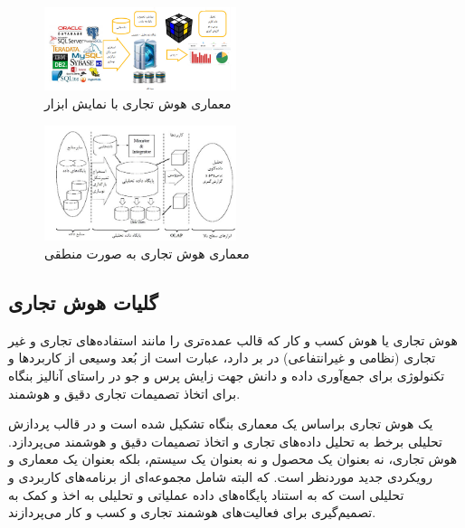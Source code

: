 \documentclass{llncs}
\begin{document}
\begin{figure}
\centering
\includegraphics[width=0.5\textwidth]{mahi/bi-2.jpg}
\centering
\caption{معماری هوش تجاری با نمایش ابزار}
\label{fig:ReportedVariables}
\end{figure}
\begin{figure}
\centering
\includegraphics[width=0.5\textwidth]{mahi/bi-3.jpg}
\centering
\caption{معماری هوش تجاری به صورت منطقی}
\label{fig:ReportedVariables}
\end{figure}

\subsection{گلیات هوش تجاری}
هوش تجاری یا هوش کسب و کار که قالب عمده‌تری را مانند استفاده‌های تجاری و غیر تجاری (نظامی و غیر‌انتفاعی) در بر دارد، عبارت است از بُعد وسیعی از کاربردها و تکنولوژی برای جمع‌آوری داده و دانش جهت زایش پرس و جو در راستای آنالیز بنگاه برای اتخاذ تصمیمات تجاری دقیق و هوشمند.

یک هوش تجاری براساس یک معماری بنگاه تشکیل شده است و در قالب پردازش تحلیلی برخط به تحلیل داده‌های تجاری و اتخاذ تصمیمات دقیق و هوشمند می‌پردازد. هوش تجاری، نه بعنوان یک محصول و نه بعنوان یک سیستم، بلکه بعنوان یک معماری و رویکردی جدید موردنظر است. که البته شامل مجموعه‌ای از برنامه‌های کاربردی و تحلیلی است که به استناد پایگاه‌های داده عملیاتی و تحلیلی به اخذ و کمک به تصمیم‌گیری برای فعالیت‌های هوشمند تجاری و کسب و کار می‌پردازند.
\end{document}
